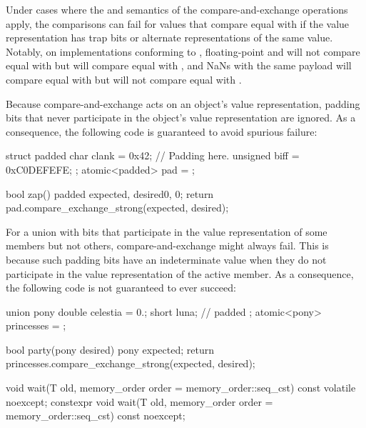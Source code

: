 \begin{itemdescr}
\pnum
\begin{note}
Under cases where the  and  semantics of the compare-and-exchange
operations apply, the comparisons can fail for values that compare equal with
 if the value representation has trap bits or alternate
representations of the same value. Notably, on implementations conforming to
\IsoFloatUndated{}, floating-point  and 
will not compare equal with  but will compare equal with ,
and NaNs with the same payload will compare equal with  but will not
compare equal with .
\end{note}
\begin{note}
Because compare-and-exchange acts on an object's value representation,
padding bits that never participate in the object's value representation
are ignored. As a consequence, the following code is guaranteed to avoid
spurious failure:
\begin{codeblock}
struct padded {
  char clank = 0x42;
  // Padding here.
  unsigned biff = 0xC0DEFEFE;
};
atomic<padded> pad = {};

bool zap() {
  padded expected, desired{0, 0};
  return pad.compare_exchange_strong(expected, desired);
}
\end{codeblock}
\end{note}
\begin{note}
For a union with bits that participate in the value representation
of some members but not others, compare-and-exchange might always fail.
This is because such padding bits have an indeterminate value when they
do not participate in the value representation of the active member.
As a consequence, the following code is not guaranteed to ever succeed:
\begin{codeblock}
union pony {
  double celestia = 0.;
  short luna;       // padded
};
atomic<pony> princesses = {};

bool party(pony desired) {
  pony expected;
  return princesses.compare_exchange_strong(expected, desired);
}
\end{codeblock}
\end{note}
\end{itemdescr}

%
%
%
%
%
%
\begin{itemdecl}
void wait(T old, memory_order order = memory_order::seq_cst) const volatile noexcept;
constexpr void wait(T old, memory_order order = memory_order::seq_cst) const noexcept;
\end{itemdecl}

